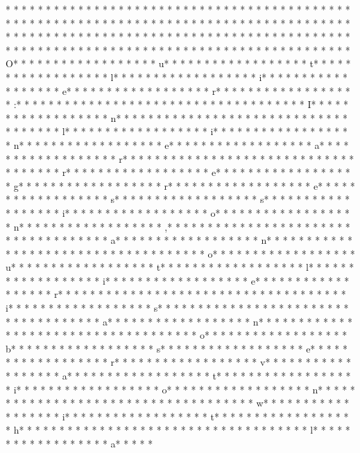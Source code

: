 * * *  * * *  * * *  *  * * *  *  * * *  * * *  * * *  *  * * *  *  * * *  * * *  * * *  *  * * *  *  * * *  *  * * *  * * *  * * *  *  * * *  *  * * *  *  * * *  * * *  * * *  *  * * *  *  * * *  *  * * *  * * *  * * *  *  * * *  *  * * *  *  * * *  * * *  * * *  *  * * *  *  * * *  *  * * *  * * *  * * *  *  * * *  *  * * *  *  * * *  * * *  * * *  *  * * *  *  * * *  *  * * *  * * *  * * *  *  * * *  *  * * *  * O* * *  * * *  * * *  *  * * *  *  * * *  * u* * *  * * *  * * *  *  * * *  *  * * *  * t* * *  * * *  * * *  *  * * *  *  * * *  * l* * *  * * *  * * *  *  * * *  *  * * *  * i* * *  * * *  * * *  *  * * *  *  * * *  * e* * *  * * *  * * *  *  * * *  *  * * *  * r* * *  * * *  * * *  *  * * *  *  * * *  * :* * *  * * *  * * *  *  * * *  *  * * *  *  * * *  * * *  * * *  *  * * *  *  * * *  * I* * *  * * *  * * *  *  * * *  *  * * *  * n* * *  * * *  * * *  *  * * *  *  * * *  *  * * *  * * *  * * *  *  * * *  *  * * *  * l* * *  * * *  * * *  *  * * *  *  * * *  * i* * *  * * *  * * *  *  * * *  *  * * *  * n* * *  * * *  * * *  *  * * *  *  * * *  * e* * *  * * *  * * *  *  * * *  *  * * *  * a* * *  * * *  * * *  *  * * *  *  * * *  * r* * *  * * *  * * *  *  * * *  *  * * *  *  * * *  * * *  * * *  *  * * *  *  * * *  * r* * *  * * *  * * *  *  * * *  *  * * *  * e* * *  * * *  * * *  *  * * *  *  * * *  * g* * *  * * *  * * *  *  * * *  *  * * *  * r* * *  * * *  * * *  *  * * *  *  * * *  * e* * *  * * *  * * *  *  * * *  *  * * *  * s* * *  * * *  * * *  *  * * *  *  * * *  * s* * *  * * *  * * *  *  * * *  *  * * *  * i* * *  * * *  * * *  *  * * *  *  * * *  * o* * *  * * *  * * *  *  * * *  *  * * *  * n* * *  * * *  * * *  *  * * *  *  * * *  * ,* * *  * * *  * * *  *  * * *  *  * * *  *  * * *  * * *  * * *  *  * * *  *  * * *  * a* * *  * * *  * * *  *  * * *  *  * * *  * n* * *  * * *  * * *  *  * * *  *  * * *  *  * * *  * * *  * * *  *  * * *  *  * * *  * o* * *  * * *  * * *  *  * * *  *  * * *  * u* * *  * * *  * * *  *  * * *  *  * * *  * t* * *  * * *  * * *  *  * * *  *  * * *  * l* * *  * * *  * * *  *  * * *  *  * * *  * i* * *  * * *  * * *  *  * * *  *  * * *  * e* * *  * * *  * * *  *  * * *  *  * * *  * r* * *  * * *  * * *  *  * * *  *  * * *  *  * * *  * * *  * * *  *  * * *  *  * * *  * i* * *  * * *  * * *  *  * * *  *  * * *  * s* * *  * * *  * * *  *  * * *  *  * * *  *  * * *  * * *  * * *  *  * * *  *  * * *  * a* * *  * * *  * * *  *  * * *  *  * * *  * n* * *  * * *  * * *  *  * * *  *  * * *  *  * * *  * * *  * * *  *  * * *  *  * * *  * o* * *  * * *  * * *  *  * * *  *  * * *  * b* * *  * * *  * * *  *  * * *  *  * * *  * s* * *  * * *  * * *  *  * * *  *  * * *  * e* * *  * * *  * * *  *  * * *  *  * * *  * r* * *  * * *  * * *  *  * * *  *  * * *  * v* * *  * * *  * * *  *  * * *  *  * * *  * a* * *  * * *  * * *  *  * * *  *  * * *  * t* * *  * * *  * * *  *  * * *  *  * * *  * i* * *  * * *  * * *  *  * * *  *  * * *  * o* * *  * * *  * * *  *  * * *  *  * * *  * n* * *  * * *  * * *  *  * * *  *  * * *  *  * * *  * * *  * * *  *  * * *  *  * * *  * w* * *  * * *  * * *  *  * * *  *  * * *  * i* * *  * * *  * * *  *  * * *  *  * * *  * t* * *  * * *  * * *  *  * * *  *  * * *  * h* * *  * * *  * * *  *  * * *  *  * * *  *  * * *  * * *  * * *  *  * * *  *  * * *  * l* * *  * * *  * * *  *  * * *  *  * * *  * a* * *  * * 